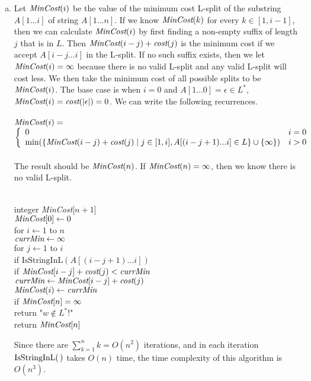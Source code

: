 \documentclass[11pt]{article}
\begin{document}



\begin{solution}
\begin{enumerate}[(a)]
\item
Let $\emph{MinCost}(i)$ be the value of the minimum cost L-split of the substring $A[1...i]$ of string $A[1...n]$. If we know $\emph{MinCost}(k)$ for every $k\in [1, i-1]$, then we can calculate $\emph{MinCost}(i)$ by first finding a non-empty suffix of length $j$ that is in $L$. Then $\emph{MinCost}(i-j)+\emph{cost}(j)$ is the minimum cost if we accept $A[i-j...i]$ in the L-split. If no such suffix exists, then we let $\emph{MinCost}(i)=\infty$ because there is no valid L-split and any valid L-split will cost less. We then take the minimum cost of all possible splits to be $\emph{MinCost}(i)$. The base case is when $i=0$ and $A[1...0]=\epsilon\in L^*$, $\emph{MinCost}(i)=\emph{cost}(|\epsilon|)=0$. We can write the following recurrences.\\\\
$\emph{MinCost}(i)=$\\
\begin{math}
  \left\{
    \begin{array}{ll}
		0 &i=0\\
		\text{min}(\{\emph{MinCost}(i-j)+\emph{cost}(j)\mid j\in[1, i], A[(i-j+1)...i]\in L\}\cup \{\infty \}) &i>0
    \end{array}
  \right.
\end{math}\\\\
The result should be $\emph{MinCost}(n)$. If $\emph{MinCost}(n)=\infty$, then we know there is no valid L-split.
\begin{algo}
	\+
\\	integer \emph{MinCost}[$n+1$]
\\	$\emph{MinCost}[0]\gets 0$
\\	for $i\gets 1$ to $n$\+
\\	$\emph{currMin}\gets \infty$
\\	for $j\gets 1$ to $i$\+
\\	if $\text{IsStringInL}(A[(i-j+1)...i])$\+
\\	if $\emph{MinCost}[i-j]+\emph{cost}(j) < \emph{currMin}$\+
\\	$\emph{currMin}\gets \emph{MinCost}[i-j]+\emph{cost}(j)$\-\-\-
\\	$\emph{MinCost}(i)\gets \emph{currMin}$\-
\\	if $\emph{MinCost}[n] = \infty$\+
\\	return "$w\notin L^*$!"\-
\\	return $\emph{MinCost}[n]$\-
\end{algo}
Since there are $\sum_{k=1}^{n}{k}=O(n^2)$ iterations, and in each iteration $\text{IsStringInL(\,)}$ takes $O(n)$ time, the time complexity of this algorithm is $O(n^3)$.


\end{enumerate}
\end{solution}
\end{document}
